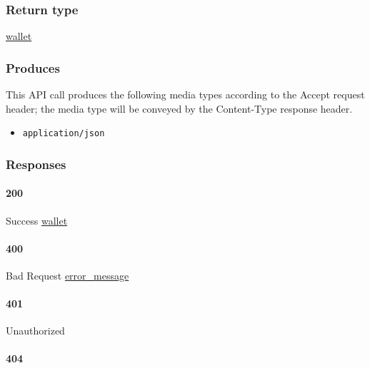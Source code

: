 \hypertarget{return-type-143}{%
\subsubsection{Return type}\label{return-type-143}}

\protect\hyperlink{wallet}{wallet}

\hypertarget{produces-182}{%
\subsubsection{Produces}\label{produces-182}}

This API call produces the following media types according to the
{Accept} request header; the media type will be conveyed by the
{Content-Type} response header.

\begin{itemize}
\tightlist
\item
  \texttt{application/json}
\end{itemize}

\hypertarget{responses-188}{%
\subsubsection{Responses}\label{responses-188}}

\hypertarget{section-605}{%
\paragraph{200}\label{section-605}}

Success \protect\hyperlink{wallet}{wallet}

\hypertarget{section-606}{%
\paragraph{400}\label{section-606}}

Bad Request \protect\hyperlink{error_message}{error\_message}

\hypertarget{section-607}{%
\paragraph{401}\label{section-607}}

Unauthorized \protect\hyperlink{}{}

\hypertarget{section-608}{%
\paragraph{404}\label{section-608}}

